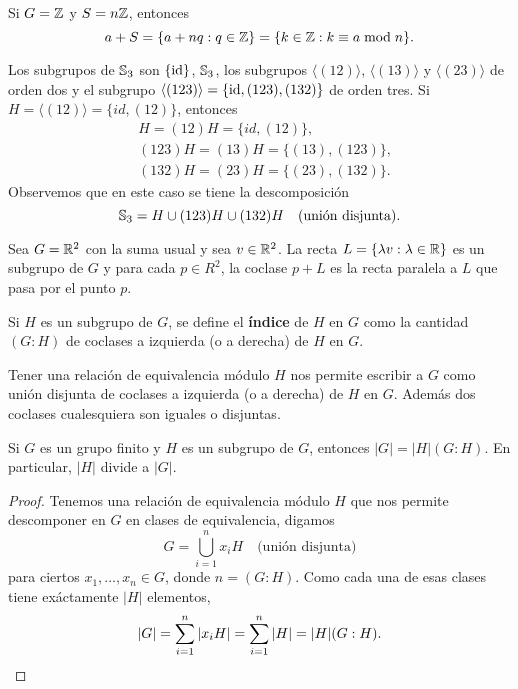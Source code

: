 \begin{example}
Si $G=\mathbb{Z}$ y $S=n\mathbb{Z}$, entonces
\[
a+S=\{a+nq:q\in\mathbb{Z}\}=\{k\in\mathbb{Z}:k\equiv a\bmod n\}.
\]	
\end{example}

\begin{example}
Los subgrupos de $\mathbb{S}_3$ son $\{\operatorname{id}\}$, $\mathbb{S}_3$, los subgrupos $\langle(12)\rangle$, $\langle(13)\rangle$ y $\langle(23)\rangle$ de orden dos 
y el subgrupo $\langle(123)\rangle=\{\operatorname{id},(123),(132)\}$ de orden tres.  	Si $H=\langle(12)\rangle=\{id,(12)\}$, entonces
\begin{align*}
&H=(12)H=\{id,(12)\},\\
&(123)H=(13)H=\{(13),(123)\},\\
&(132)H=(23)H=\{(23),(132)\}.
\end{align*}
Observemos que en este caso se tiene la descomposición
\[
\mathbb{S}_3=H\cup (123)H\cup (132)H\quad\text{(unión disjunta)}.
\]
\end{example}

\begin{example}
Sea $G=\mathbb{R}^2$ con la suma usual y sea $v\in\mathbb{R}^2$. La recta $L=\{\lambda v:\lambda\in\mathbb{R}\}$ es un subgrupo de $G$ y 
para cada $p\in R^2$, la coclase $p+L$ es la recta paralela a $L$ que pasa por el punto $p$.  	
\end{example}


\begin{definition}
	Si $H$ es un subgrupo de $G$, se define el \textbf{índice} de $H$ en $G$
	como la cantidad $(G:H)$ de coclases a izquierda (o a derecha) de $H$ en $G$. 
\end{definition}

Tener una relación de equivalencia módulo $H$ nos permite escribir a $G$ como
unión disjunta de coclases a izquierda (o a derecha) de $H$ en $G$. Además dos
coclases cualesquiera son iguales o disjuntas. 

\begin{theorem}[Lagrange]
	Si $G$ es un grupo finito y $H$ es un subgrupo de $G$, entonces
	$|G|=|H|(G:H)$. En particular, $|H|$ divide a $|G|$. 
\end{theorem}

\begin{proof}
	Tenemos una relación de equivalencia módulo $H$ que nos permite descomponer
	en $G$ en clases de equivalencia, digamos
	\[
	G=\bigcup_{i=1}^n x_iH\quad\text{(unión disjunta)}
	\]
	para ciertos $x_1,\dots,x_n\in G$, donde $n=(G:H)$. Como cada una de esas clases tiene exáctamente
	$|H|$ elementos,  
	\[
		|G|=\sum_{i=1}^n|x_iH|=\sum_{i=1}^n|H|=|H|(G:H).\qedhere
	\]
\end{proof}

